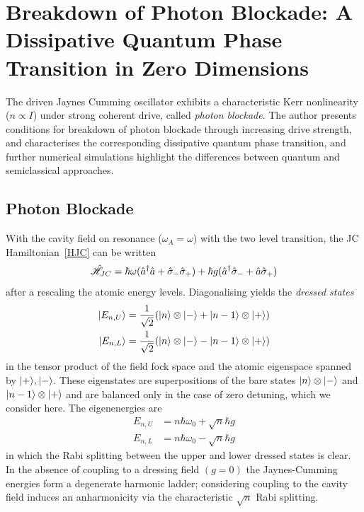 
\section{Breakdown of Photon Blockade: A Dissipative Quantum Phase Transition in Zero Dimensions}
The driven Jaynes Cumming oscillator exhibits a characteristic Kerr nonlinearity ($n \propto I$) under strong coherent drive, called \emph{photon blockade}\autocite{Carmichael2015}. The author presents conditions for breakdown of photon blockade through increasing drive strength, and characterises the corresponding dissipative quantum phase transition, and further numerical simulations highlight the differences between quantum and semiclassical approaches.
\subsection{Photon Blockade}
With the cavity field on resonance ($\omega_A = \omega$) with the two level transition, the JC Hamiltonian~\cref{HJC} can be written\autocite[3]{Carmichael2015}
\begin{equation}
  \hat{\mathscr{H}}_{JC} = \hbar \omega (\hat{a}^\dagger \hat{a} + \hat{\sigma}_- \hat{\sigma}_+) +\hbar g (\hat{a}^\dagger \hat{\sigma}_- + \hat{a} \hat{\sigma}_+)
\end{equation}
after a rescaling the atomic energy levels. Diagonalising yields the \emph{dressed states}
\begin{align}
  | E_{n, U} \rangle & = \frac{1}{\sqrt{2}} (| n \rangle \otimes | - \rangle+| n-1 \rangle \otimes | + \rangle) \\
  | E_{n, L} \rangle & = \frac{1}{\sqrt{2}} (| n \rangle \otimes | - \rangle-| n-1 \rangle \otimes | + \rangle)
\end{align}
in the tensor product of the field fock space and the atomic eigenspace spanned by $| + \rangle, | - \rangle$. These eigenstates are superpositions of the bare states $| n \rangle \otimes | - \rangle$ and $| n-1 \rangle \otimes | + \rangle$ and are balanced only in the case of zero detuning, which we consider here. The eigenenergies are
\begin{align}
  E_{n, U} &= n \hbar \omega_0 + \sqrt{n} \hbar g \\
  E_{n, L} &= n \hbar \omega_0 - \sqrt{n} \hbar g
\end{align}
in which the Rabi splitting between the upper and lower dressed states is clear. In the absence of coupling to a dressing field $(g=0)$ the Jaynes-Cumming energies form a degenerate harmonic ladder; considering coupling to the cavity field induces an anharmonicity via the characteristic $\sqrt{n}$ Rabi splitting.

